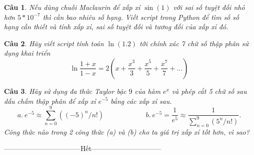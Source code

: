\documentclass[answers]{exam}
\newtheorem{bt}{Câu}
\begin{document}
\begin{bt}
Nếu dùng chuỗi Maclaurin để xấp xỉ $\sin(1)$ với sai số tuyệt đối nhỏ hơn $5 * 10^{-7}$ thì cần bao nhiêu số hạng. Viết script trong Python để tìm số số hạng cần thiết và tính xấp xỉ, sai số tuyệt đối và tương đối của xấp xỉ đó.
\end{bt}

\begin{bt} 
Hãy viết script tính toán $\ln(1.2)$ tới chính xác 7 chữ số thập phân sử dụng khai triển 
%
\[
\ln \dfrac{1+x}{1-x} = 2 \left( x + \dfrac{x^3}{3} + \dfrac{x^5}{5} + \dfrac{x^7}{7} + ...  \right)
\]
%
\end{bt}

\begin{bt}
Hãy sử dụng đa thức Taylor bậc $9$ của hàm $e^x$ và phép cắt 5 chữ số sau dấu chấm thập phân để xấp xỉ $e^{-5}$ bằng các xấp xỉ sau.
%
\[
a.\ e^{-5} \approx \sum_{n=0}^{9}((-5)^n/n!) \qquad \qquad \qquad b.\ e^{-5} = \frac{1}{e^5} \approx \frac{1}{\sum_{n=0}^{9}(5^n/n!)}. 
\]
%
Công thức nào trong 2 công thức (a) và (b) cho ta giá trị xấp xỉ tốt hơn, vì sao?
\end{bt}

\centerline{———————————Hết——————————}

% 
   
\end{document}
